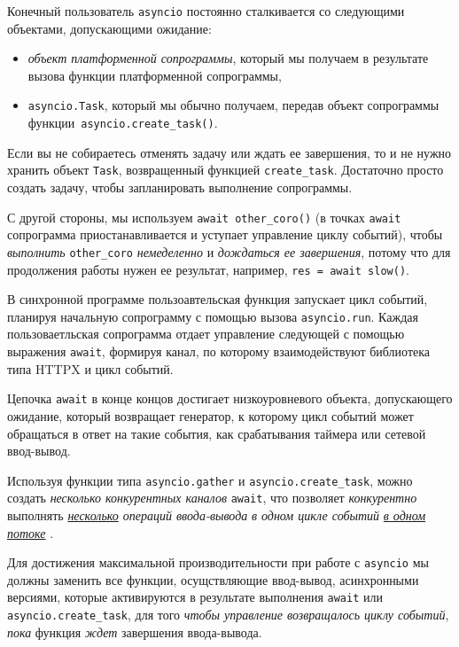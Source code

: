 \documentclass[%
	11pt,
	a4paper,
	utf8,
		]{article}
\begin{document}
Конечный пользователь \verb*|asyncio| постоянно сталкивается со следующими объектами, допускающими ожидание:
\begin{itemize}
	\item \emph{объект платформенной сопрограммы}, который мы получаем в результате вызова функции платформенной сопрограммы,
	
	\item \verb|asyncio.Task|, который мы обычно получаем, передав объект сопрограммы\\ функции~\verb|asyncio.create_task()|.
\end{itemize}

Если вы не собираетесь отменять задачу или ждать ее завершения, то и не нужно хранить объект \verb|Task|, возвращенный функцией \verb|create_task|. Достаточно просто создать задачу, чтобы запланировать выполнение сопрограммы.

С другой стороны, мы используем \verb|await other_coro()| (в точках \verb|await| сопрограмма приостанавливается и уступает управление циклу событий), чтобы \emph{выполнить} \verb|other_coro| \emph{немеделенно} и \emph{дождаться ее завершения}, потому что для продолжения работы нужен ее результат, например, \verb|res = await slow()|. 

В синхронной программе пользоавтельская функция запускает цикл событий, планируя начальную сопрограмму с помощью вызова \verb*|asyncio.run|. Каждая пользоваетльская сопрограмма отдает управление следующей с помощью выражения \verb|await|, формируя канал, по которому взаимодействуют библиотека типа HTTPX и цикл событий.

Цепочка \verb*|await| в конце концов достигает низкоуровневого объекта, допускающего ожидание, который возвращает генератор, к которому цикл событий может обращаться в ответ на такие события, как срабатывания таймера или сетевой ввод-вывод.

Используя функции типа \verb|asyncio.gather| и \verb*|asyncio.create_task|, можно создать \emph{\color{blue}несколько конкурентных каналов} {\color{blue}\verb|await|}, что позволяет \emph{конкурентно} выполнять \emph{\underline{несколько} операций ввода-вывода} \emph{в одном цикле событий} \underline{\itshape в одном потоке} \cite[]{ramalho:python-2022}.

Для достижения максимальной производительности при работе с \verb*|asyncio| мы должны заменить все функции, осущствляющие ввод-вывод, асинхронными версиями, которые активируются в результате выполнения \verb|await| или \verb*|asyncio.create_task|, для того \emph{чтобы управление возвращалось циклу событий}, \emph{пока} функция \emph{ждет} завершения ввода-вывода.
\end{document}
